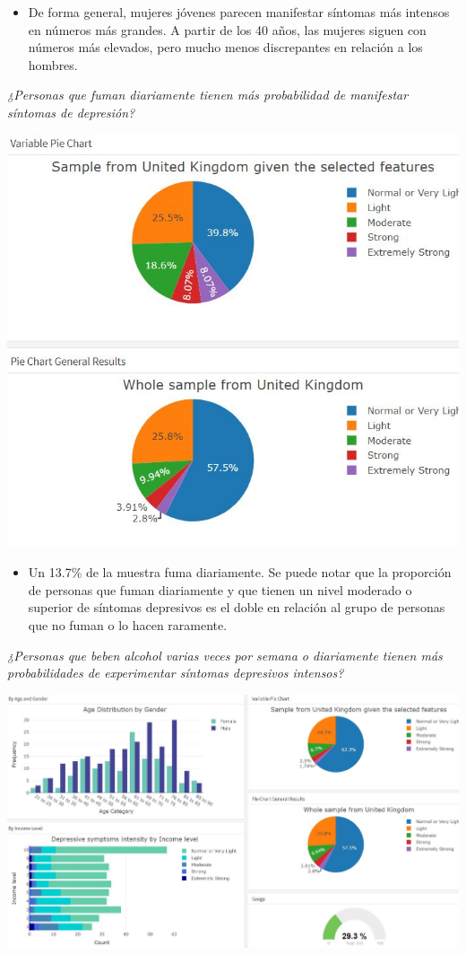 \documentclass{report}
\begin{document}
\begin{itemize}
\item De forma general, mujeres jóvenes parecen manifestar síntomas más intensos en números más grandes. A partir de los 40 años, las mujeres siguen con números más elevados, pero mucho menos discrepantes en relación a los hombres.
\end{itemize}

\textit{¿Personas que fuman diariamente tienen más probabilidad de manifestar síntomas de depresión?}

\includegraphics[width=1\textwidth]{daily_cig.JPG}

\begin{itemize}
\item Un 13.7\% de la muestra fuma diariamente. Se puede notar que la proporción de personas que fuman diariamente y que tienen un nivel moderado o superior de síntomas depresivos es el doble en relación al grupo de personas que no fuman o lo hacen raramente. 
\end{itemize}


\textit{¿Personas que beben alcohol varias veces por semana o diariamente tienen más probabilidades de experimentar síntomas depresivos intensos?}

\includegraphics[width=1\textwidth]{dep_alc.JPG}
\end{document}
